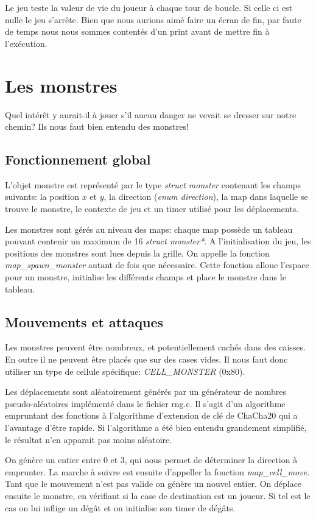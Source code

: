 \documentclass[12pt,a4paper]{article} %
\begin{document}
Le jeu teste la valeur de vie du joueur à chaque tour de boucle. Si celle ci est nulle le jeu s'arrête. Bien que nous aurions aimé faire un écran de fin, par faute de temps nous nous sommes contentés d'un print avant de mettre fin à l'exécution.

\section{Les monstres}

Quel intérêt y aurait-il à jouer s'il aucun danger ne vevait se dresser sur notre chemin?
Ils nous faut bien entendu des monstres!

\subsection{Fonctionnement global}

L'objet monstre est représenté par le type \emph{struct monster} contenant les champs suivants: la position $x$ et $y$, la direction (\emph{enum direction}), 
la map dans laquelle se trouve le monstre, le contexte de jeu et un timer utilisé pour les déplacements.

Les monstres sont gérés au niveau des maps: chaque map possède un tableau pouvant contenir un maximum de 16 \emph{struct monster*}. A l'initialisation du jeu,  les positions des monstres sont lues depuis la grille. On appelle la fonction \emph{map\_spawn\_monster} autant de fois que nécessaire. Cette fonction alloue l'espace pour un monstre, initialise les différents champs et place le monstre dans le tableau.


\subsection{Mouvements et attaques}

Les monstres peuvent être nombreux, et potentiellement cachés dans des caisses. En outre il ne peuvent être placés que sur des cases vides. 
Il nous faut donc utiliser un type de cellule spécifique: \emph{CELL\_MONSTER} (0x80).

Les déplacements sont aléatoirement générés par un générateur de nombres pseudo-aléatoires implémenté dans le fichier rng.c.
Il s'agit d'un algorithme empruntant des fonctions à l'algorithme d'extension de clé de ChaCha20 qui a l'avantage d'être rapide.
Si l'algorithme a été bien entendu grandement simplifié, le résultat n'en apparait pas moins aléatoire.

On génère un entier entre 0 et 3, qui nous permet de déterminer la direction à emprunter.
La marche à suivre est ensuite d'appeller la fonction \emph{map\_cell\_move}. Tant que le mouvement n'est pas valide on génère un nouvel entier.
On déplace ensuite le monstre, en vérifiant si la case de destination est un joueur. Si tel est le cas on lui inflige un dégât et on 
initialise son timer de dégâts.
\end{document}
